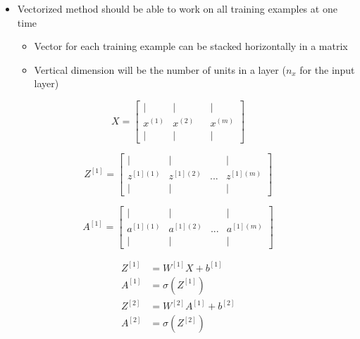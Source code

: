 \documentclass[12pt, letterpaper]{article}
\begin{document}
    \begin{itemize}
        \item Vectorized method should be able to work on all training examples at one time
        \begin{itemize}
            \item Vector for each training example can be stacked horizontally in a matrix
            \item Vertical dimension will be the number of units in a layer ($n_x$ for the input layer)
        \end{itemize}
    \end{itemize}

    $$X=\begin{bmatrix}
        \mid & \mid & & \mid \\
        x^{(1)} & x^{(2)} & & x^{(m)} \\
        \mid & \mid & & \mid
    \end{bmatrix}$$

    $$Z^{[1]}=\begin{bmatrix}
        \mid & \mid & & \mid \\
        z^{[1](1)} & z^{[1](2)} & ... & z^{[1](m)} \\
        \mid & \mid & & \mid
    \end{bmatrix}$$

    $$A^{[1]}=\begin{bmatrix}
        \mid & \mid & & \mid \\
        a^{[1](1)} & a^{[1](2)} & ... & a^{[1](m)} \\
        \mid & \mid & & \mid
    \end{bmatrix}$$
    
    \begin{align*}
        Z^{[1]}&=W^{[1]}X+b^{[1]} \\
        A^{[1]}&=\sigma(Z^{[1]}) \\
        Z^{[2]}&=W^{[2]}A^{[1]}+b^{[2]} \\
        A^{[2]}&=\sigma(Z^{[2]})
    \end{align*}
\end{document}

